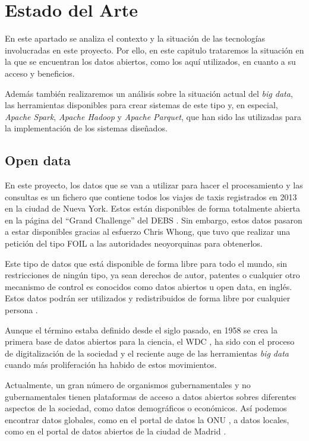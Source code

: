 \chapter{Estado del Arte\label{sec:estado_del_arte}}
En este apartado se analiza el contexto y la situación de las tecnologías involucradas en este proyecto. Por ello, en este capitulo trataremos la situación en la que se encuentran los datos abiertos, como los aquí utilizados, en cuanto a su acceso y beneficios. 

Además también realizaremos un análisis sobre la situación actual del \textit{big data}, las herramientas disponibles para crear sistemas de este tipo y, en especial, \textit{Apache Spark}, \textit{Apache Hadoop} y \textit{Apache Parquet}, que han sido las utilizadas para la implementación de los sistemas diseñados.

\section{Open data}

En este proyecto, los datos que se van a utilizar para hacer el procesamiento y las consultas es un fichero que contiene todos los viajes de taxis registrados en 2013 en la ciudad de Nueva York. Estos están disponibles de forma totalmente abierta en la página del ``Grand Challenge'' del \gls{DEBS} \cite{grandChallenge}. Sin embargo, estos datos pasaron a estar disponibles gracias al esfuerzo Chris Whong, que tuvo que realizar una petición del tipo \gls{FOIL} a las autoridades neoyorquinas para obtenerlos.

Este tipo de datos que está disponible de forma libre para todo el mundo, sin restricciones de ningún tipo, ya sean derechos de autor, patentes o cualquier otro mecanismo de control es conocidos como datos abiertos u open data, en inglés. Estos datos podrán ser utilizados y redistribuidos de forma libre por cualquier persona \cite{opendata}.

Aunque el término estaba definido desde el siglo pasado, en 1958 se crea la primera base de datos abiertos para la ciencia, el \gls{WDC} \cite{wdc}, ha sido con el proceso de digitalización de la sociedad y el  reciente auge de las herramientas \textit{big data} cuando más proliferación ha habido de estos movimientos.

Actualmente, un gran número de organismos gubernamentales y no gubernamentales tienen plataformas de acceso a datos abiertos sobres diferentes aspectos de la sociedad, como datos demográficos o económicos. Así podemos encontrar datos globales, como en el portal de datos la \gls{ONU} \cite{onudata}, a datos locales, como en el portal de datos abiertos de la ciudad de Madrid \cite{datosMadrid}.

